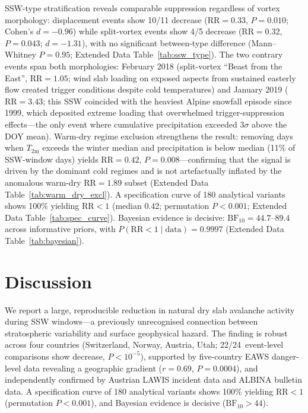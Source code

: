 \documentclass[11pt,letterpaper]{article}
\begin{document}
SSW-type stratification reveals comparable suppression regardless of vortex morphology: displacement events show 10/11 decrease ($\mathrm{RR} = 0.33$, $P = 0.010$; Cohen's $d = -0.96$) while split-vortex events show 4/5 decrease ($\mathrm{RR} = 0.32$, $P = 0.043$; $d = -1.31$), with no significant between-type difference (Mann--Whitney $P = 0.95$; Extended Data Table~\ref{tab:ssw_type}). The two contrary events span both morphologies: February 2018 (split-vortex ``Beast from the East'', $\mathrm{RR} = 1.05$; wind slab loading on exposed aspects from sustained easterly flow created trigger conditions despite cold temperatures) and January 2019 ($\mathrm{RR} = 3.43$; this SSW coincided with the heaviest Alpine snowfall episode since 1999, which deposited extreme loading that overwhelmed trigger-suppression effects---the only event where cumulative precipitation exceeded $3\sigma$ above the DOY mean). Warm-dry regime exclusion strengthens the result: removing days when $T_{\mathrm{2m}}$ exceeds the winter median and precipitation is below median (11\% of SSW-window days) yields $\mathrm{RR} = 0.42$, $P = 0.008$---confirming that the signal is driven by the dominant cold regimes and is not artefactually inflated by the anomalous warm-dry $\mathrm{RR} = 1.89$ subset (Extended Data Table~\ref{tab:warm_dry_excl}). A specification curve of 180 analytical variants shows 100\% yielding $\mathrm{RR} < 1$ (median 0.42; permutation $P < 0.001$; Extended Data Table~\ref{tab:spec_curve}). Bayesian evidence is decisive: $\mathrm{BF}_{10} = 44.7$--$89.4$ across informative priors, with $P(\mathrm{RR} < 1 \mid \mathrm{data}) = 0.9997$ (Extended Data Table~\ref{tab:bayesian}).

\section*{Discussion}

We report a large, reproducible reduction in natural dry slab avalanche activity during SSW windows---a previously unrecognised connection between stratospheric variability and surface geophysical hazard. The finding is robust across four countries (Switzerland, Norway, Austria, Utah; 22/24~event-level comparisons show decrease, $P < 10^{-5}$), supported by five-country EAWS danger-level data revealing a geographic gradient ($r = 0.69$, $P = 0.0004$), and independently confirmed by Austrian LAWIS incident data and ALBINA bulletin data. A specification curve of 180 analytical variants shows 100\% yielding $\mathrm{RR} < 1$ (permutation $P < 0.001$), and Bayesian evidence is decisive ($\mathrm{BF}_{10} > 44$).
\end{document}
